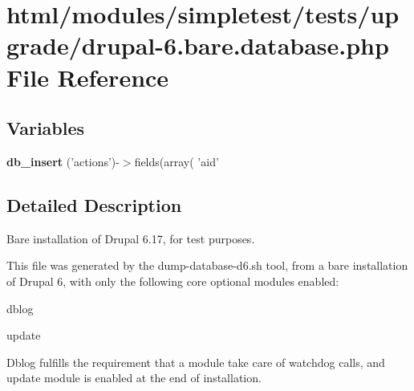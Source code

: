 \hypertarget{drupal-6_8bare_8database_8php}{
\section{html/modules/simpletest/tests/upgrade/drupal-\/6.bare.database.php File Reference}
\label{drupal-6_8bare_8database_8php}
}
\subsection*{Variables}
\begin{DoxyCompactItemize}
\item 
\hypertarget{drupal-6_8bare_8database_8php_ad55e7a118dfd30b2c7b4bfb7f8888a52}{
{\bfseries db\_\-insert} ('actions')-\/$>$fields(array( 'aid'}
\label{drupal-6_8bare_8database_8php_ad55e7a118dfd30b2c7b4bfb7f8888a52}

\end{DoxyCompactItemize}


\subsection{Detailed Description}
Bare installation of Drupal 6.17, for test purposes.

This file was generated by the dump-\/database-\/d6.sh tool, from a bare installation of Drupal 6, with only the following core optional modules enabled:
\begin{DoxyItemize}
\item dblog
\item update
\end{DoxyItemize}

Dblog fulfills the requirement that a module take care of watchdog calls, and update module is enabled at the end of installation. 